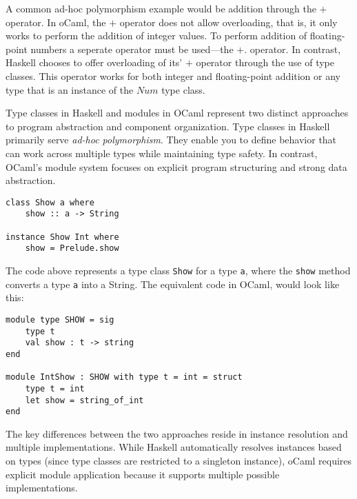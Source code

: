 
A common ad-hoc polymorphism example would be addition through the $+$ operator. In oCaml, the $+$ operator does not allow overloading, that is, it only works to perform the addition of integer values. To perform addition of floating-point numbers a seperate operator must be used---the $+.$ operator. In contrast, Haskell chooses to offer overloading of its' $+$ operator through the use of type classes. This operator works for both integer and floating-point addition or any type that is an instance of the $Num$ type class.



Type classes in Haskell and modules in OCaml represent two distinct approaches to program abstraction and component organization. Type classes in Haskell primarily serve \textit{ad-hoc polymorphism}. They enable you to define behavior that can work across multiple types while maintaining type safety. 
In contrast, OCaml's module system focuses on explicit program structuring and strong data abstraction. 

\begin{lstlisting}
class Show a where
    show :: a -> String

instance Show Int where
    show = Prelude.show
\end{lstlisting}

The code above represents a type class \lstinline|Show| for a type \lstinline|a|, where the \lstinline|show| method converts a type \lstinline|a| into a String. The equivalent code in OCaml, would look like this:
\begin{lstlisting}
module type SHOW = sig
    type t
    val show : t -> string
end

module IntShow : SHOW with type t = int = struct
    type t = int
    let show = string_of_int
end
\end{lstlisting}

The key differences between the two approaches reside in instance resolution and multiple implementations. While Haskell automatically resolves instances based on types (since type classes are restricted to a singleton instance), oCaml requires explicit module application because it supports multiple possible implementations.

